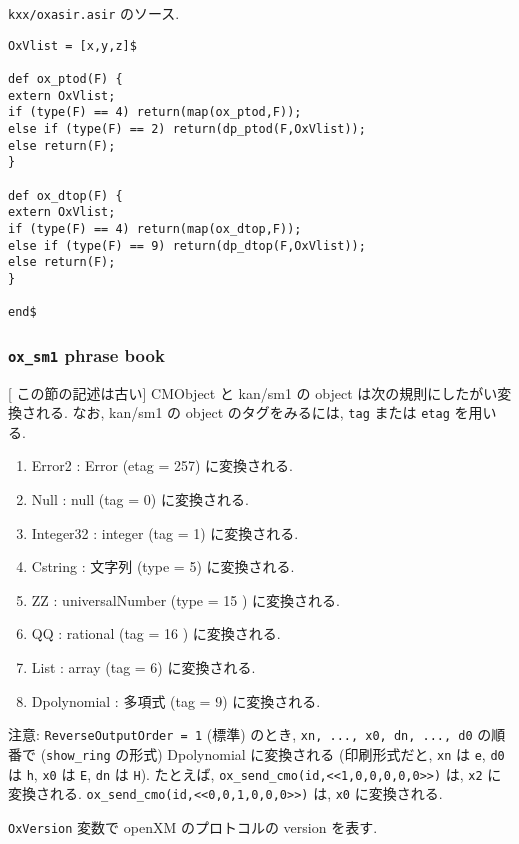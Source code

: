 {\tt kxx/oxasir.asir} のソース.
{\footnotesize \begin{verbatim}
OxVlist = [x,y,z]$

def ox_ptod(F) {
extern OxVlist;
if (type(F) == 4) return(map(ox_ptod,F));
else if (type(F) == 2) return(dp_ptod(F,OxVlist));
else return(F);
}

def ox_dtop(F) {
extern OxVlist;
if (type(F) == 4) return(map(ox_dtop,F));
else if (type(F) == 9) return(dp_dtop(F,OxVlist));
else return(F);
}

end$
\end{verbatim}}

\subsubsection{ {\tt ox\_sm1} phrase book }

[ この節の記述は古い]
CMObject と kan/sm1 の object は次の規則にしたがい変換される.
なお, kan/sm1 の object のタグをみるには, {\tt tag} または {\tt etag}
を用いる.
\begin{enumerate}
\item Error2 : Error (etag = 257) に変換される.
\item Null : null (tag = 0) に変換される.
\item Integer32 : integer (tag = 1) に変換される.
\item Cstring : 文字列 (type = 5) に変換される.
\item ZZ : universalNumber (type = 15 ) に変換される.
\item QQ : rational (tag = 16 ) に変換される.
\item List : array (tag = 6) に変換される.
\item Dpolynomial : 多項式 (tag = 9) に変換される.
\end{enumerate}



注意: {\tt ReverseOutputOrder = 1} (標準)
のとき, {\tt xn, ..., x0, dn, ..., d0} の順番で
({\tt show\_ring} の形式) Dpolynomial に変換される
(印刷形式だと,
{\tt xn} は {\tt e}, {\tt d0} は {\tt h},
{\tt x0} は {\tt E}, {\tt dn} は {\tt H}).
たとえば,
{\tt ox\_send\_cmo(id,<<1,0,0,0,0,0>>)}  は,
{\tt x2} に変換される.
{\tt ox\_send\_cmo(id,<<0,0,1,0,0,0>>)}  は,
{\tt x0} に変換される.

{\tt OxVersion} 変数で openXM のプロトコルの version を表す.

